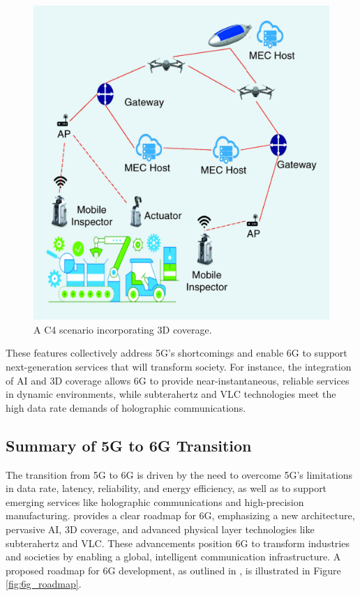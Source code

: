 \documentclass[acmtog]{acmart}
\begin{document}
\begin{figure}[h]
  \centering
  \includegraphics[width=\linewidth]{3D_coverage.png}
  \caption{A C4 scenario incorporating 3D coverage. \cite{ref4}}
  \label{fig:c4_3d_coverage}
\end{figure}

These features collectively address 5G's shortcomings and enable 6G to support next-generation services that will transform society. For instance, the integration of AI and 3D coverage allows 6G to provide near-instantaneous, reliable services in dynamic environments, while subterahertz and VLC technologies meet the high data rate demands of holographic communications.

\subsection{Summary of 5G to 6G Transition}

The transition from 5G to 6G is driven by the need to overcome 5G's limitations in data rate, latency, reliability, and energy efficiency, as well as to support emerging services like holographic communications and high-precision manufacturing. \citet{ref4} provides a clear roadmap for 6G, emphasizing a new architecture, pervasive AI, 3D coverage, and advanced physical layer technologies like subterahertz and VLC. These advancements position 6G to transform industries and societies by enabling a global, intelligent communication infrastructure. A proposed roadmap for 6G development, as outlined in \citet{ref4}, is illustrated in Figure \ref{fig:6g_roadmap}.
\end{document}
